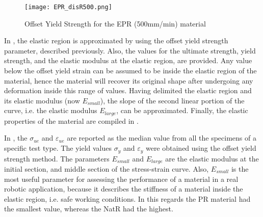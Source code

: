 \begin{figure}[H]
    \vspace*{-2em}
    \centering
    \texttt{[image: EPR\_disR500.png]}
    \caption{Offset Yield Strength for the EPR (500mm/min) material}
    \label{fig:EPR500off}
\end{figure}

In , the elastic region is approximated by using the offset yield strength parameter, described previously. Also, the values for the ultimate strength, yield strength, and the elastic modulus at the elastic region, are provided. Any value below the offset yield strain can be assumed to be inside the elastic region of the material, hence the material will recover its original shape after undergoing any deformation inside this range of values. Having delimited the elastic region and its elastic modulus (now $E_{small}$), the slope of the second linear portion of the curve, i.e. the elastic modulus $E_{large}$, can be approximated. Finally, the elastic properties of the material are compiled in .

In , the $\sigma_{ue}$ and $\varepsilon_{ue}$ are reported as the median value from all the specimens of a specific test type. The yield values $\sigma_{y}$ and $\varepsilon_{y}$ were obtained using the offset yield strength method. The parameters $E_{small}$ and $E_{large}$ are the elastic modulus at the initial section, and middle section of the stress-strain curve. Also, $E_{small}$ is the most useful parameter for assessing the performance of a material in a real robotic application, because it describes the stiffness of a material inside the elastic region, i.e. safe working conditions. In this regards the PR material had the smallest value, whereas the NatR had the highest.


